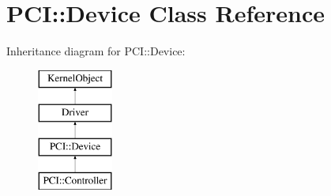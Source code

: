 \hypertarget{class_p_c_i_1_1_device}{}\section{P\+CI\+:\+:Device Class Reference}
\label{class_p_c_i_1_1_device}
Inheritance diagram for P\+CI\+:\+:Device\+:\begin{figure}[H]
\begin{center}
\leavevmode
\includegraphics[height=4.000000cm]{class_p_c_i_1_1_device}
\end{center}
\end{figure}
